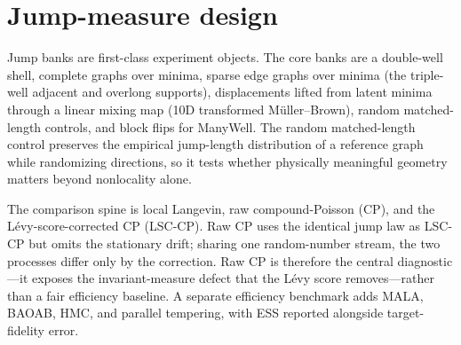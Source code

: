 \section{Jump-measure design}
Jump banks are first-class experiment objects. The core banks are a double-well shell, complete graphs over minima, sparse edge graphs over minima (the triple-well adjacent and overlong supports), displacements lifted from latent minima through a linear mixing map (10D transformed M\"uller--Brown), random matched-length controls, and block flips for ManyWell. The random matched-length control preserves the empirical jump-length distribution of a reference graph while randomizing directions, so it tests whether physically meaningful geometry matters beyond nonlocality alone.

The comparison spine is local Langevin, raw compound-Poisson (CP), and the L\'evy-score-corrected CP (LSC-CP). Raw CP uses the identical jump law as LSC-CP but omits the stationary drift; sharing one random-number stream, the two processes differ only by the correction. Raw CP is therefore the central diagnostic---it exposes the invariant-measure defect that the L\'evy score removes---rather than a fair efficiency baseline. A separate efficiency benchmark adds MALA, BAOAB, HMC, and parallel tempering, with ESS reported alongside target-fidelity error.
